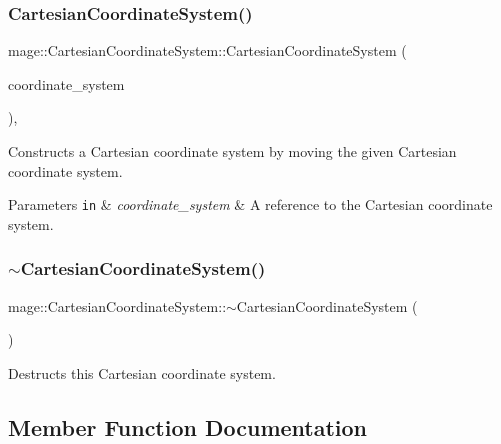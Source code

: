 \subsubsection{\texorpdfstring{Cartesian\+Coordinate\+System()}{CartesianCoordinateSystem()}\hspace{0.1cm}{\footnotesize\ttfamily [4/4]}}
{\footnotesize\ttfamily mage\+::\+Cartesian\+Coordinate\+System\+::\+Cartesian\+Coordinate\+System (\begin{DoxyParamCaption}\item[{\hyperlink{structmage_1_1_cartesian_coordinate_system}{Cartesian\+Coordinate\+System} \&\&}]{coordinate\+\_\+system }\end{DoxyParamCaption})\hspace{0.3cm}{\ttfamily [default]}, {\ttfamily [noexcept]}}

Constructs a Cartesian coordinate system by moving the given Cartesian coordinate system.


\begin{DoxyParams}[1]{Parameters}
\mbox{\tt in}  & {\em coordinate\+\_\+system} & A reference to the Cartesian coordinate system. \\
\hline
\end{DoxyParams}
\hypertarget{structmage_1_1_cartesian_coordinate_system_a86effcef63e455323c194063c0f1fd46}{}\label{structmage_1_1_cartesian_coordinate_system_a86effcef63e455323c194063c0f1fd46} 
\subsubsection{\texorpdfstring{$\sim$\+Cartesian\+Coordinate\+System()}{~CartesianCoordinateSystem()}}
{\footnotesize\ttfamily mage\+::\+Cartesian\+Coordinate\+System\+::$\sim$\+Cartesian\+Coordinate\+System (\begin{DoxyParamCaption}{ }\end{DoxyParamCaption})\hspace{0.3cm}{\ttfamily [default]}}

Destructs this Cartesian coordinate system. 

\subsection{Member Function Documentation}
\hypertarget{structmage_1_1_cartesian_coordinate_system_ae329f2a0d4d3a4c96d745d3af10fcaad}{}\label{structmage_1_1_cartesian_coordinate_system_ae329f2a0d4d3a4c96d745d3af10fcaad} 

